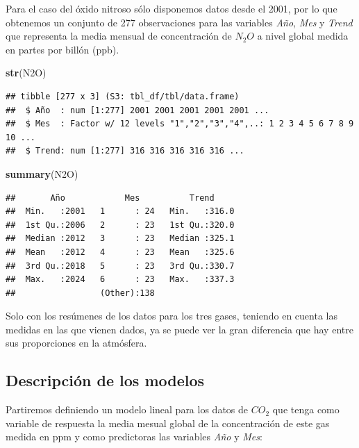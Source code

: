 \documentclass[12pt,a4paper,]{book}
\newenvironment{Shaded}{\begin{snugshade}}{\end{snugshade}}
\newcommand{\FunctionTok}[1]{\textcolor[rgb]{0.13,0.29,0.53}{\textbf{#1}}}
\newcommand{\NormalTok}[1]{#1}
\numberwithin{dummy}{section}
\theoremstyle{ocrenumbox}
\theoremstyle{blacknumex}
\theoremstyle{blacknumbox}
\theoremstyle{ocrenum}
\theoremstyle{ocrenum}
\begin{document}
Para el caso del óxido nitroso sólo disponemos datos desde el 2001, por
lo que obtenemos un conjunto de 277 observaciones para las variables
\emph{Año}, \emph{Mes} y \emph{Trend} que representa la media mensual de
concentración de \(N_2O\) a nivel global medida en partes por billón
(ppb).

\begin{Shaded}
\begin{Highlighting}[]
\FunctionTok{str}\NormalTok{(N2O)}
\end{Highlighting}
\end{Shaded}

\begin{verbatim}
## tibble [277 x 3] (S3: tbl_df/tbl/data.frame)
##  $ Año  : num [1:277] 2001 2001 2001 2001 2001 ...
##  $ Mes  : Factor w/ 12 levels "1","2","3","4",..: 1 2 3 4 5 6 7 8 9 10 ...
##  $ Trend: num [1:277] 316 316 316 316 316 ...
\end{verbatim}

\begin{Shaded}
\begin{Highlighting}[]
\FunctionTok{summary}\NormalTok{(N2O)}
\end{Highlighting}
\end{Shaded}

\begin{verbatim}
##       Año            Mes          Trend      
##  Min.   :2001   1      : 24   Min.   :316.0  
##  1st Qu.:2006   2      : 23   1st Qu.:320.0  
##  Median :2012   3      : 23   Median :325.1  
##  Mean   :2012   4      : 23   Mean   :325.6  
##  3rd Qu.:2018   5      : 23   3rd Qu.:330.7  
##  Max.   :2024   6      : 23   Max.   :337.3  
##                 (Other):138
\end{verbatim}

Solo con los resúmenes de los datos para los tres gases, teniendo en
cuenta las medidas en las que vienen dados, ya se puede ver la gran
diferencia que hay entre sus proporciones en la atmósfera.

\hypertarget{descripciuxf3n-de-los-modelos}{%
\subsection{Descripción de los
modelos}\label{descripciuxf3n-de-los-modelos}}

Partiremos definiendo un modelo lineal para los datos de \(CO_2\) que
tenga como variable de respuesta la media mesual global de la
concentración de este gas medida en ppm y como predictoras las variables
\emph{Año} y \emph{Mes}:
\end{document}
